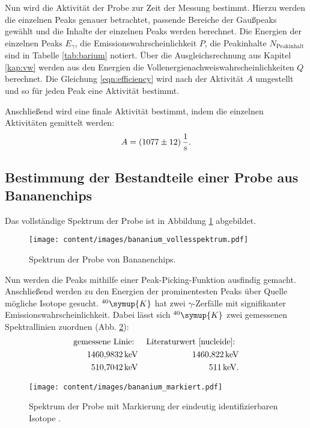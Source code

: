 Nun wird die Aktivität der Probe zur Zeit der Messung bestimmt.
Hierzu werden die einzelnen Peaks genauer betrachtet, passende Bereiche der Gaußpeaks gewählt und die Inhalte der einzelnen Peaks werden berechnet.
Die Energien der einzelnen Peaks $E_{\gamma}$, die Emissionswahrscheinlichkeit $P$, die Peakinhalte $N_{\text{Peakinhalt}}$ sind in Tabelle \ref{tab:barium} notiert.
Über die Ausgleichsrechnung aus Kapitel \ref{kap:vw} werden aus den Energien die Vollenergienachweiswahrscheinlichkeiten $Q$ berechnet.
Die Gleichung \eqref{eqn:efficiency} wird nach der Aktivität $A$ umgestellt und so für jeden Peak eine Aktivität bestimmt.

Anschließend wird eine finale Aktivität bestimmt, indem die einzelnen Aktivitäten gemittelt werden:
\begin{equation*}
    A = \SI{1077 (12)}{\frac{1}{s}}.
\end{equation*}
\FloatBarrier

\subsection{Bestimmung der Bestandteile einer Probe aus Bananenchips}
Das vollständige Spektrum der Probe ist in Abbildung \ref{fig:banane_spectrum} abgebildet.
\begin{figure}[h!]
  \centering
  \texttt{[image: content/images/bananium\_vollesspektrum.pdf]}
  \caption{Spektrum der Probe von Bananenchips.}
  \label{fig:banane_spectrum}
\end{figure}
Nun werden die Peaks mithilfe einer Peak-Picking-Funktion ausfindig gemacht.
Anschließend werden zu den Energien der prominentesten Peaks über Quelle \cite{nucleide} mögliche Isotope gesucht.
$^{40}\symup{K}$ hat zwei $\gamma$-Zerfälle mit signifikanter Emissionswahrscheinlichkeit.
Dabei lässt sich $^{40}\symup{K}$ zwei gemessenen Spektrallinien zuordnen (Abb. \ref{fig:bananium_mark}):
\begin{align*}
    \text{gemessene Linie: }            && \text{Literaturwert \cite{nucleide}: }\\
    \SI{1460.9832}{\kilo \electronvolt} && \SI{1460.822}{\kilo \electronvolt} \\
    \SI{510.7042}{\kilo \electronvolt}  && \SI{511}{\kilo \electronvolt} . \\
\end{align*}
\begin{figure}[h!]
  \centering
  \texttt{[image: content/images/bananium\_markiert.pdf]}
  \caption{Spektrum der Probe mit Markierung der eindeutig identifizierbaren Isotope \cite{nucleide}.}
  \label{fig:bananium_mark}
\end{figure}
\FloatBarrier
